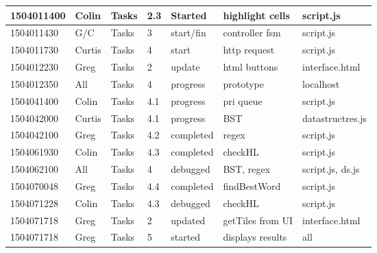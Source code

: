 \documentclass[10pt, oneside]{article}
\begin{document}
\begin{tabular}{|p{1.8cm}|p{1.75cm}|p{1.25cm}|p{0.8cm}|p{1.6cm}|p{3cm}|p{2.8cm}|}
	\hline
	1504011400 & Colin & Tasks & 2.3 & Started & highlight cells & script.js \\
	\hline
	1504011430 & G/C & Tasks & 3 & start/fin & controller fsm & script.js \\
	\hline
	1504011730 & Curtis & Tasks & 4 & start & http request & script.js \\
	\hline
	1504012230 & Greg & Tasks & 2 & update & html buttons & interface.html \\
	\hline 
	1504012350 & All & Tasks & 4 & progress & prototype & localhost \\
	\hline 
	1504041400 & Colin & Tasks & 4.1 & progress & pri queue & script.js \\
	\hline
	1504042000 & Curtis & Tasks & 4.1 & progress & BST & datastructres.js \\
	\hline
	1504042100 & Greg & Tasks & 4.2 & completed & regex & script.js \\
	\hline
	1504061930 & Colin & Tasks & 4.3 & completed & checkHL & script.js \\
	\hline
	1504062100 & All & Tasks & 4 & debugged & BST, regex & script.js, ds.js \\
	\hline
	1504070048 & Greg & Tasks & 4.4 & completed & findBestWord & script.js \\
	\hline
	1504071228 & Colin & Tasks & 4.3 & debugged & checkHL & script.js \\
	\hline
	1504071718 & Greg & Tasks & 2 & updated & getTiles from UI & interface.html \\
	\hline
	1504071718 & Greg & Tasks & 5 & started & displays results & all \\
	\hline
	
	
	
\end{tabular}
\end{document}
